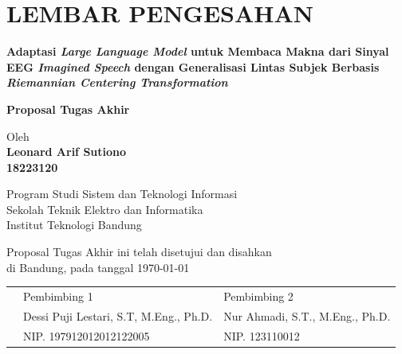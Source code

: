 \chapter*{LEMBAR PENGESAHAN}


\begin{center}
    \vspace{2cm}
  {\large\bfseries Adaptasi \textit{Large Language Model} untuk Membaca Makna dari Sinyal EEG \textit{Imagined Speech} dengan Generalisasi Lintas Subjek Berbasis \textit{Riemannian Centering Transformation}}\\
     \vspace{2cm}

  {\Large \textbf{Proposal Tugas Akhir}}\\


  \vspace{1.5cm}
    
    
  {\large Oleh}\\[0.3cm]
    \textbf{
    {\large Leonard Arif Sutiono}\\
    {\large 18223120}
  }\\
    
  \vspace{0.5cm}
 
  {\large Program Studi Sistem dan Teknologi Informasi}\\
  {\large Sekolah Teknik Elektro dan Informatika}\\
  {\large Institut Teknologi Bandung}\\

  \vspace{1.5cm}

  Proposal Tugas Akhir ini telah disetujui dan disahkan\\ 
  di Bandung, pada tanggal \today\\[1cm]


\end{center}

\vspace{0.5cm}


\begin{tabular}{p{1cm}p{7cm}p{7cm}}
  & Pembimbing 1 & Pembimbing 2 \\[3cm]
  & Dessi Puji Lestari, S.T, M.Eng., Ph.D. & Nur Ahmadi, S.T., M.Eng., Ph.D. \\[0.2cm]
  & NIP. 197912012012122005 & NIP. 123110012
\end{tabular}

\vspace{1cm}
\noindent